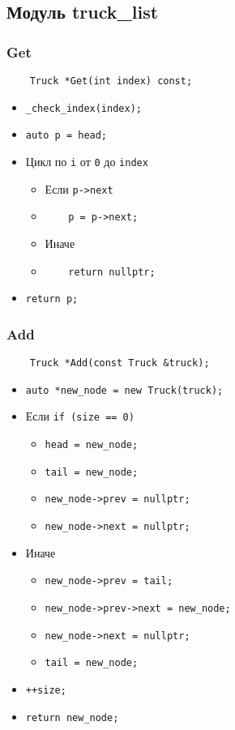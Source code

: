 \subsection{Модуль truck\_list}

\subsubsection{Get}

\begin{lstlisting}
    Truck *Get(int index) const;
\end{lstlisting}

\begin{itemize}
    \item \verb|_check_index(index);|
    \item \verb|auto p = head;|
    \item Цикл по \verb|i| от \verb|0| до \verb|index|
        \begin{itemize}
            \item Если \verb|p->next|
            \item \verb|    p = p->next;|
            \item Иначе
            \item \verb|    return nullptr;|
        \end{itemize}
    \item \verb|return p;|
\end{itemize}

\subsubsection{Add}

\begin{lstlisting}
    Truck *Add(const Truck &truck);
\end{lstlisting}

\begin{itemize}
    \item \verb|auto *new_node = new Truck(truck);|
    \item Если \verb|if (size == 0)|
    \begin{itemize}
        \item \verb|head = new_node;|
        \item \verb|tail = new_node;|
        \item \verb|new_node->prev = nullptr;|
        \item \verb|new_node->next = nullptr;|
    \end{itemize}
    \item Иначе
    \begin{itemize}
        \item \verb|new_node->prev = tail;|
        \item \verb|new_node->prev->next = new_node;|
        \item \verb|new_node->next = nullptr;|
        \item \verb|tail = new_node;|
    \end{itemize}
    \item \verb|++size;|
    \item \verb|return new_node;|
\end{itemize}

